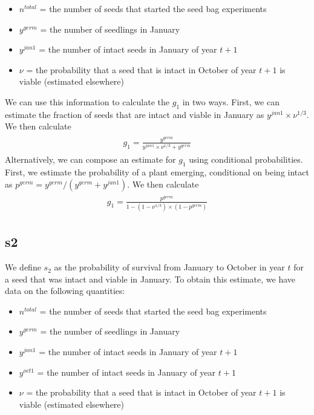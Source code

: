 \documentclass[12pt, oneside]{article}   	%
\begin{document}
\begin{itemize}
	\item $n^{total}$ = the number of seeds that started the seed bag experiments
	\item $y^{germ}$ = the number of seedlings in January
	\item $y^{jan1}$ = the number of intact seeds in January of year $t+1$
	\item $\nu$ = the probability that a seed that is intact in October of year $t+1$ is viable (estimated elsewhere)
\end{itemize}

We can use this information to calculate the $g_1$ in two ways. First, we can estimate the fraction of seeds that are intact and viable in January as $y^{jan1}\times \nu^{1/3}$. We then calculate 
%
    \begin{align}
\begin{split}
g_1 = \frac{ y^{germ}}{y^{jan1}\times \nu^{1/3} + y^{germ}}
  \end{split}
\end{align}
%
Alternatively, we can compose an estimate for $g_1$ using conditional probabilities. First, we estimate the probability of a plant emerging, conditional on being intact as $p^{germ} = y^{germ}/(y^{germ}+y^{jan1})$. We then calculate 
%
    \begin{align}
\begin{split}
g_1 = \frac{p^{germ} }{1 - ( 1-  \nu^{1/3} ) \times ( 1 - p^{germ} )}
  \end{split}
\end{align}
%

\subsection*{s2}

We define $s_2$ as the probability of survival from January to October in year $t$ for a seed that was intact and viable in January. To obtain this estimate, we have data on the following quantities:

\begin{itemize}
	\item $n^{total}$ = the number of seeds that started the seed bag experiments
	\item $y^{germ}$ = the number of seedlings in January
	\item $y^{jan1}$ = the number of intact seeds in January of year $t+1$
	\item $y^{oct1}$ = the number of intact seeds in January of year $t+1$
	\item $\nu$ = the probability that a seed that is intact in October of year $t+1$ is viable (estimated elsewhere)
\end{itemize}
\end{document}
